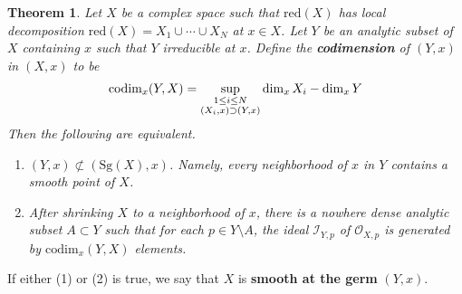 \documentclass[12pt,b5paper,notitlepage]{report}
\theoremstyle{definition}
\theoremstyle{plain}
\newtheorem{thm}[df]{Theorem}
\newcommand{\scr}{\mathscr}
\newcommand{\red}{\mathrm{red}}
\newcommand{\Sg}{\mathrm{Sg}}
\newcommand{\codim}{\mathrm{codim}}
\numberwithin{equation}{section}
\begin{document}
\begin{thm}\label{lb387}
Let $X$ be a complex space such that $\red(X)$ has local decomposition $\red(X)=X_1\cup\cdots\cup X_N$ at $x\in X$. Let $Y$ be an analytic subset of $X$ containing $x$ such that $Y$ irreducible at $x$. Define the \textbf{codimension} of $(Y,x)$ in $(X,x)$ to be  \index{codim@$\codim_x(Y,X)$}
\begin{align}
\codim_x(Y,X)=\sup_{
\begin{subarray}{c}
1\leq i\leq N\\
(X_i,x)\supset(Y,x)
\end{subarray}
}\dim_x X_i-\dim_xY \label{eq196}
\end{align}
Then the following are equivalent.
\begin{enumerate}[label=(\arabic*)]
\item $(Y,x)\nsubset(\Sg(X),x)$. Namely, every neighborhood of $x$ in $Y$ contains a smooth point of $X$.
\item After shrinking $X$ to a neighborhood of $x$, there is a nowhere dense analytic subset $A\subset Y$ such that for each $p\in Y\setminus A$, the ideal $\scr I_{Y,p}$ of $\scr O_{X,p}$ is generated by $\codim_x(Y,X)$ elements.
\end{enumerate}
\end{thm}

If either (1) or (2) is true, we say that $X$ is \textbf{smooth at the germ} $(Y,x)$. 
\end{document}
